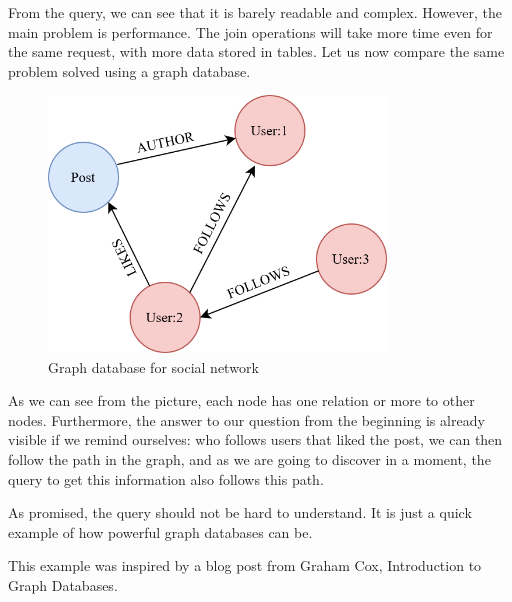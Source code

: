 From the query, we can see that it is barely readable and complex. However, the main problem is performance. The join operations will take more time even for the same request, with more data stored in tables. Let us now compare the same problem solved using a graph database.

\begin{figure}[H]
    \centering
    \includegraphics[width=0.8\textwidth]{content/graph_example.png}
    \caption{Graph database for social network}
\end{figure}

As we can see from the picture, each node has one relation or more to other nodes. Furthermore,
the answer to our question from the beginning is already visible if we remind ourselves:
who follows users that liked the post, we can then follow the path in the graph, and as we are going to discover in a moment,
the query to get this information also follows this path.


As promised, the query should not be hard to understand. It is just a quick example of how powerful graph databases can be.

This example was inspired by a blog post from Graham Cox, Introduction to Graph Databases. \cite{cox_introduction_2017}

